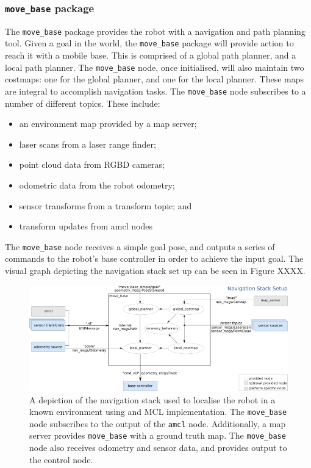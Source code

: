 \documentclass[a4paper]{article}
\begin{document}
\subsubsection{\texttt{move\_base} package}
The \texttt{move\_base} package provides the robot with a navigation and path planning tool. Given a goal in the world, the \texttt{move\_base} package will provide action to reach it with a mobile base. This is comprised of a global path planner, and a local path planner. The \texttt{move\_base} node, once initialised, will also maintain two costmaps: one for the global planner, and one for the local planner. These maps are integral to accomplish navigation tasks. The \texttt{move\_base} node subscribes to a number of different topics. These include:
\begin{itemize}
\item an environment map provided by a map server;
\item laser scans from a laser range finder;
\item point cloud data from RGBD cameras;
\item odometric data from the robot odometry;
\item sensor transforms from a transform topic; and
\item transform updates from amcl nodes
\end{itemize}

The \texttt{move\_base} node receives a simple goal pose, and outputs a series of commands to the robot's base controller in order to achieve the input goal. The visual graph depicting the navigation stack set up can be seen in Figure XXXX.
\begin{figure}[h]
\centering
\includegraphics[scale=0.7]{move_base}
\caption{A depiction of the navigation stack used to localise the robot in a known environment using and MCL implementation. The \texttt{move\_base} node subscribes to the output of the \texttt{amcl} node. Additionally, a map server provides \texttt{move\_base} with a ground truth map. The \texttt{move\_base} node also receives odometry and sensor data, and provides output to the control node.}
\end{figure}
\end{document}
